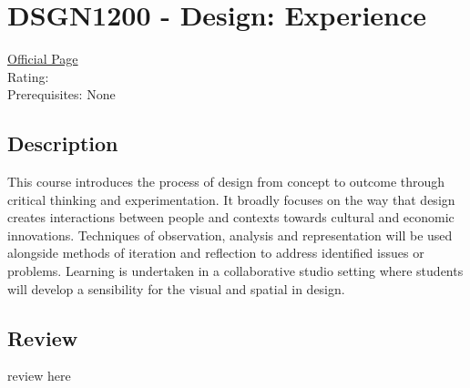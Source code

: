 \hypertarget{DSGN1200}{\section{DSGN1200 - Design: Experience}}

\large
\textcolor{turbo_purple}{\href{https://my.uq.edu.au/programs-courses/course.html?course_code=DSGN1200}{Official Page}} \\
Rating: \cstar\cstar\cstar\cstar\ostar \\
Prerequisites: None

\normalsize
\subsection*{Description}
This course introduces the process of design from concept to outcome through critical thinking and experimentation.
It broadly focuses on the way that design creates interactions between people and contexts towards cultural and economic innovations.
Techniques of observation, analysis and representation will be used alongside methods of iteration and reflection to address identified issues or problems.
Learning is undertaken in a collaborative studio setting where students will develop a sensibility for the visual and spatial in design.

\subsection*{Review}
review here
